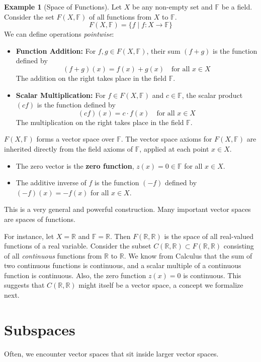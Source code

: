 \documentclass[11pt]{article}
\theoremstyle{definition}
\newtheorem{example}[theorem]{Example}
\newcommand{\F}{\mathbb{F}}
\newcommand{\R}{\mathbb{R}}
\begin{document}
\begin{example}[Space of Functions]
Let $X$ be any non-empty set and $\F$ be a field. Consider the set $F(X, \F)$ of all functions from $X$ to $\F$.
\[ F(X, \F) = \{ f \mid f: X \to \F \} \]
We can define operations \emph{pointwise}:
\begin{itemize}
    \item \textbf{Function Addition:} For $f, g \in F(X, \F)$, their sum $(f+g)$ is the function defined by
    \[ (f+g)(x) = f(x) + g(x) \quad \text{for all } x \in X \]
    The addition on the right takes place in the field $\F$.
    \item \textbf{Scalar Multiplication:} For $f \in F(X, \F)$ and $c \in \F$, the scalar product $(cf)$ is the function defined by
    \[ (cf)(x) = c \cdot f(x) \quad \text{for all } x \in X \]
    The multiplication on the right takes place in the field $\F$.
\end{itemize}
$F(X, \F)$ forms a vector space over $\F$. The vector space axioms for $F(X, \F)$ are inherited directly from the field axioms of $\F$, applied at each point $x \in X$.
\begin{itemize}
    \item The zero vector is the \textbf{zero function}, $z(x) = 0 \in \F$ for all $x \in X$.
    \item The additive inverse of $f$ is the function $(-f)$ defined by $(-f)(x) = -f(x)$ for all $x \in X$.
\end{itemize}
This is a very general and powerful construction. Many important vector spaces are spaces of functions.

For instance, let $X = \R$ and $\F = \R$. Then $F(\R, \R)$ is the space of all real-valued functions of a real variable.
Consider the subset $C(\R, \R) \subset F(\R, \R)$ consisting of all \emph{continuous} functions from $\R$ to $\R$. We know from Calculus that the sum of two continuous functions is continuous, and a scalar multiple of a continuous function is continuous. Also, the zero function $z(x)=0$ is continuous. This suggests that $C(\R, \R)$ might itself be a vector space, a concept we formalize next.
\end{example}

\section{Subspaces}

Often, we encounter vector spaces that sit inside larger vector spaces.
\end{document}

